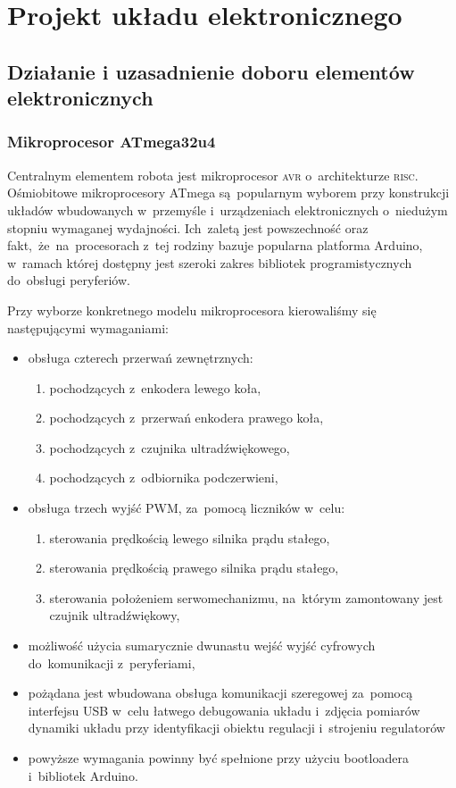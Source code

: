 \documentclass[11pt]{article}
\begin{document}
\section{Projekt układu elektronicznego}
\subsection{Działanie i uzasadnienie doboru elementów elektronicznych}
\subsubsection{Mikroprocesor ATmega32u4}
Centralnym elementem robota jest mikroprocesor \textsc{avr} o~architekturze \textsc{risc}. Ośmiobitowe mikroprocesory ATmega są~popularnym wyborem przy konstrukcji układów wbudowanych w~przemyśle i~urządzeniach elektronicznych o~niedużym stopniu wymaganej wydajności.
Ich~zaletą jest powszechność oraz fakt,~że~na~procesorach z~tej rodziny bazuje popularna platforma Arduino, w~ramach której dostępny jest szeroki zakres bibliotek programistycznych do~obsługi peryferiów. 

\noindent\begin{minipage}{\linewidth}
Przy wyborze konkretnego modelu mikroprocesora kierowaliśmy się następującymi wymaganiami:
\begin{itemize}
	\item obsługa czterech przerwań zewnętrznych:
		\begin{enumerate}
			\item pochodzących z~enkodera lewego koła,
			\item pochodzących z~przerwań enkodera prawego koła,
			\item pochodzących z~czujnika ultradźwiękowego,
			\item pochodzących z~odbiornika podczerwieni, 
		\end{enumerate}
	\item obsługa trzech wyjść PWM, za~pomocą liczników w~celu:
		\begin{enumerate}
			\item sterowania prędkością lewego silnika prądu stałego,
			\item sterowania prędkością prawego silnika prądu stałego,
			\item sterowania położeniem serwomechanizmu, na~którym zamontowany jest czujnik ultradźwiękowy,
		\end{enumerate}
	\item możliwość użycia sumarycznie dwunastu wejść wyjść cyfrowych do~komunikacji z~peryferiami,
	\item pożądana jest wbudowana obsługa komunikacji szeregowej za~pomocą interfejsu USB w~celu łatwego debugowania układu i~zdjęcia pomiarów dynamiki układu przy identyfikacji obiektu regulacji i~strojeniu regulatorów
	\item powyższe wymagania powinny być spełnione przy użyciu bootloadera i~bibliotek Arduino.
\end{itemize}
\hspace{5mm}
\end{minipage}
\end{document}
